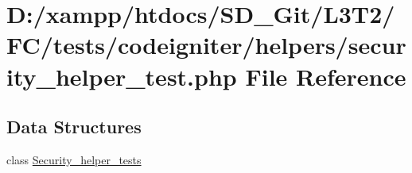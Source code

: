 \hypertarget{tests_2codeigniter_2helpers_2security__helper__test_8php}{}\section{D\+:/xampp/htdocs/\+S\+D\+\_\+\+Git/\+L3\+T2/\+F\+C/tests/codeigniter/helpers/security\+\_\+helper\+\_\+test.php File Reference}
\label{tests_2codeigniter_2helpers_2security__helper__test_8php}
\subsection*{Data Structures}
\begin{DoxyCompactItemize}
\item 
class \hyperlink{class_security__helper__tests}{Security\+\_\+helper\+\_\+tests}
\end{DoxyCompactItemize}
